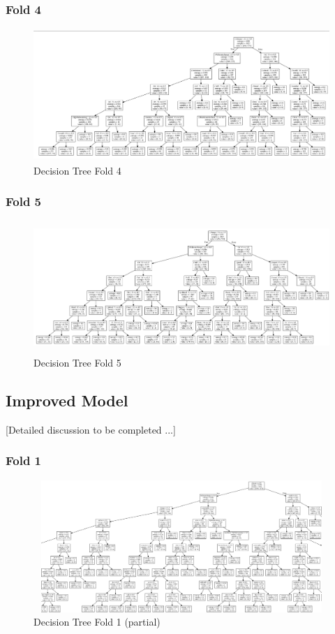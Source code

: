 \documentclass{article} %
\begin{document}
\subsubsection{Fold 4}

\begin{figure}[H]
	\includegraphics[height=5cm, width=17cm]{9.png}
	\caption{Decision Tree Fold 4}
\end{figure}

\subsubsection{Fold 5}

\begin{figure}[H]
	\includegraphics[height=5cm, width=17cm]{10.png}
	\caption{Decision Tree Fold 5}
\end{figure}


\subsection{Improved Model}


[Detailed discussion to be completed ...]

\subsubsection{Fold 1}

\begin{figure}[H]
	\includegraphics[height=5cm, width=17cm]{11.png}
	\caption{Decision Tree Fold 1 (partial)}
\end{figure}
\end{document}
